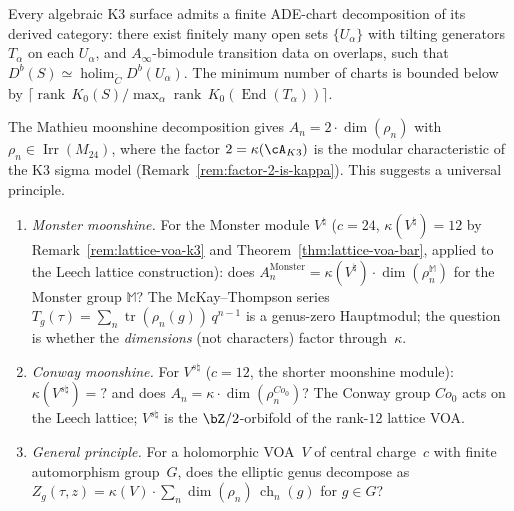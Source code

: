 \begin{conjecture}
\label{conj:ade-chart-k3}
\ClaimStatusConjectured\quad
Every algebraic K3 surface admits a finite ADE-chart
decomposition of its derived category: there exist finitely
many open sets $\{U_\alpha\}$ with tilting generators
$T_\alpha$ on each $U_\alpha$, and
$A_\infty$-bimodule transition data on overlaps, such that
$D^b(S) \simeq \operatorname{holim}_{\check{C}} D^b(U_\alpha)$.
The minimum number of charts is bounded below by
$\lceil \operatorname{rank}\,K_0(S) / \max_\alpha
\operatorname{rank}\,K_0(\operatorname{End}(T_\alpha)) \rceil$.
\end{conjecture}



\begin{openproblem}
\label{op:programme-b-moonshine}
The Mathieu moonshine decomposition gives
$A_n = 2 \cdot \dim(\rho_n)$ with
$\rho_n \in \operatorname{Irr}(M_{24})$, where the
factor $2 = \kappa(\cA_{K3})$ is the modular characteristic
of the K3 sigma model
(Remark~\ref{rem:factor-2-is-kappa}).
This suggests a universal principle.
\begin{enumerate}[label=\textup{(B\arabic*)}]
\item \emph{Monster moonshine.} For the Monster module
 $V^\natural$ ($c = 24$, $\kappa(V^\natural) = 12$ by
 Remark~\ref{rem:lattice-voa-k3} and
 Theorem~\ref{thm:lattice-voa-bar}, applied to the
 Leech lattice construction):
 does $A_n^{\text{Monster}} = \kappa(V^\natural) \cdot
 \dim(\rho_n^{\mathbb{M}})$ for the Monster group
 $\mathbb{M}$?
 The McKay--Thompson series $T_g(\tau) =
 \sum_n \operatorname{tr}(\rho_n(g))\,q^{n-1}$ is a
 genus-zero Hauptmodul; the question is whether the
 \emph{dimensions} (not characters) factor through~$\kappa$.
\item \emph{Conway moonshine.} For $V^{s\natural}$
 ($c = 12$, the shorter moonshine module):
 $\kappa(V^{s\natural}) = ?$ and does
 $A_n = \kappa \cdot \dim(\rho_n^{Co_0})$?
 The Conway group $Co_0$ acts on the Leech lattice;
 $V^{s\natural}$ is the $\bZ/2$-orbifold of the
 rank-$12$ lattice VOA.
\item \emph{General principle.} For a holomorphic VOA~$V$
 of central charge~$c$ with finite automorphism group~$G$,
 does the elliptic genus decompose as
 $Z_g(\tau,z) = \kappa(V) \cdot \sum_n
 \dim(\rho_n)\,\operatorname{ch}_n(g)$ for $g \in G$?
\end{enumerate}
\end{openproblem}

